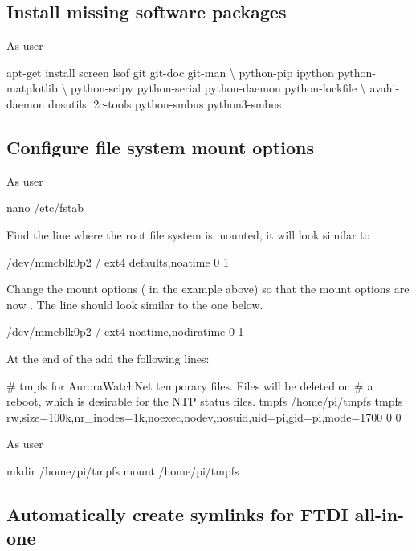 \subsection{Install missing software packages}
As user \rootUser
\begin{Cmd}
apt-get install screen lsof git git-doc git-man \textbackslash
    python-pip ipython python-matplotlib \textbackslash
    python-scipy python-serial python-daemon python-lockfile \textbackslash
    avahi-daemon dnsutils i2c-tools python-smbus python3-smbus
\end{Cmd}

\subsection{Configure file system mount options}

As user \rootUser
\begin{Cmd}
nano /etc/fstab  
\end{Cmd}

Find the line where the root file system is mounted, it will look
similar to
\begin{Cmd}
/dev/mmcblk0p2  /               ext4    defaults,noatime  0       1
\end{Cmd}
Change the mount options ( in the example
above) so that the mount options are now
. The line should look similar to the one
below.
\begin{Cmd}
/dev/mmcblk0p2  /               ext4    noatime,nodiratime  0       1
\end{Cmd}

At the end of the  add the following lines:
\begin{Cmd}[fontsize=\relsize{-2.5}]
# tmpfs for AuroraWatchNet temporary files. Files will be deleted on 
# a reboot, which is desirable for the NTP status files.
tmpfs  /home/pi/tmpfs  tmpfs  rw,size=100k,nr_inodes=1k,noexec,nodev,nosuid,uid=pi,gid=pi,mode=1700  0  0
\end{Cmd}

As user \rootUser
\begin{Cmd}
mkdir /home/pi/tmpfs
mount /home/pi/tmpfs
\end{Cmd}

\subsection{Automatically create symlinks for FTDI all-in-one}

